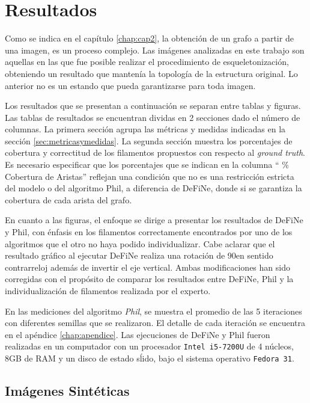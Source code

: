 \chapter{Resultados}
\label{chap:res}

Como se indica en el cap\'itulo \ref{chap:cap2}, la obtenci\'on de un grafo a partir de una imagen, es un proceso complejo. Las im\'agenes analizadas en este trabajo son aquellas en las que fue posible realizar el procedimiento de esqueletonizaci\'on, obteniendo un resultado que manten\'ia la topolog\'ia de la estructura original. Lo anterior no es un estando que pueda garantizarse para toda imagen. 


Los resultados que se presentan a continuaci\'on se separan entre tablas y figuras. Las tablas de resultados se encuentran dividas en 2 secciones dado el n\'umero de columnas. La primera secci\'on agrupa las m\'etricas y medidas indicadas en la secci\'on \ref{sec:metricasymedidas}. La segunda secci\'on muestra los porcentajes de cobertura y correctitud de los filamentos propuestos con respecto al {\it ground truth}.
Es necesario especificar que los porcentajes que se indican en la columna `` \% Cobertura de Aristas'' reflejan una condici\'on que no es una restricci\'on estricta del modelo o del algoritmo Phil, a diferencia de DeFiNe, donde si se garantiza la cobertura de cada arista del grafo.


En cuanto a las figuras, el enfoque se dirige a presentar los resultados de DeFiNe y Phil, con \'enfasis en los filamentos correctamente encontrados por uno de los algoritmos que el otro no haya podido individualizar. Cabe aclarar que el resultado gr\'afico al ejecutar DeFiNe realiza una rotaci\'on de 90\textdegree en sentido contrarreloj adem\'as de invertir el eje vertical. Ambas modificaciones han sido corregidas con el prop\'osito de comparar los resultados entre DeFiNe, Phil y la individualizaci\'on de filamentos realizada por el experto.


En las mediciones del algoritmo {\it Phil}, se muestra el promedio de las 5 iteraciones con diferentes semillas que se realizaron. El detalle de cada iteraci\'on se encuentra en el ap\'endice \ref{chap:apendice}.
Las ejecuciones de DeFiNe y Phil fueron realizadas en un computador con un procesador {\tt Intel i5-7200U} de 4 n\'ucleos, 8GB de RAM y un disco de estado s\'lido, bajo el sistema operativo {\tt Fedora 31}.

\section{Im\'agenes Sint\'eticas}

